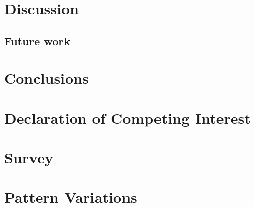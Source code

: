 \documentclass[final,5p,times]{elsarticle}%
\begin{document}
\begin{linenumbers}
\section{Discussion}
\label{sec:Discussion}



    \subsection{Future work}
    \label{subsec:Future_work}
    

\section{Conclusions}
\label{sec:Conclusion}


\section{Declaration of Competing Interest}
\label{sec:DeclarationInterest}


%

\end{linenumbers}




\newpage
\clearpage
\appendix

\section{Survey}
\label{sec:Annexsurvey}


\section{Pattern Variations}
\label{sec:AnnexVariations}

\end{document}
